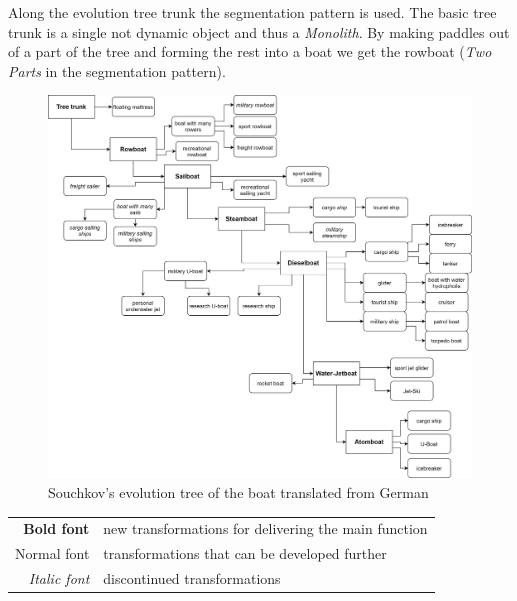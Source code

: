 \documentclass[11pt,a4paper]{article}
\begin{document}
Along the evolution tree trunk the segmentation pattern is used. The basic
tree trunk is a single not dynamic object and thus a \textit{Monolith}. By
making paddles out of a part of the tree and forming the rest into a boat we
get the rowboat (\textit{Two Parts} in the segmentation pattern).   

\begin{figure}[htb]
  \centering
  \includegraphics[width=\textwidth]{figures/boat.png}
  \caption{\small Souchkov's evolution tree of the boat translated from German
    \cite{KS}}
	\label{fig:boat}
\end{figure}
\begin{tabular}{r@{: }l}
\textbf{Bold font} & new transformations for delivering the main function\\
Normal font & transformations that can be developed further\\
\textit{Italic font} & discontinued transformations
\end{tabular}
\end{document}

